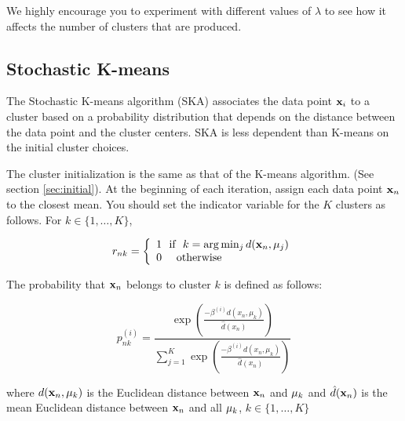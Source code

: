 \documentclass[11pt]{article}
\newcommand{\vxi}{{\bf x}_i}
\newcommand{\vxn}{{\bf x}_n}
\newcommand{\vmuk}{{\bf \mu}_k}
\newcommand{\vmuj}{{\bf \mu}_j}
\begin{document}
We highly encourage you to experiment with different values of $\lambda$ to see how it affects the number of clusters that are produced.

\subsection{Stochastic K-means}
The Stochastic K-means algorithm (SKA) associates the data point $\vxi$ to a cluster based on a probability distribution that depends on the distance between the data point and the cluster centers. SKA is less dependent than K-means on the initial cluster choices.

The cluster initialization is the same as that of the K-means algorithm. (See section \ref{sec:initial}). At the beginning of each iteration, assign each data point $\vxn$ to the closest mean. You should set the indicator variable for the $K$ clusters as follows. For $k \in \{1,\ldots,K\}$,


\begin{equation}
\label{eq:E4}
r_{nk} =  \left\{
     \begin{array}{lr}
        1~~  \textrm{if} ~~  k = \arg\min_j d(\vxn, \vmuj)  \\
        0 ~~   ~~ \textrm{otherwise}
     \end{array}
   \right.
\end{equation}

\noindent The probability that $\vxn$ belongs to cluster $k$ is defined as follows:

\begin{equation}
\label{eq:E5}
p_{nk}^{(i)} =  \frac{\exp\left(\frac{-\beta^{(i)}d(x_n,\mu_k)}{\hat{d}(x_n)}\right)}{\sum_{j=1}^{K} \exp\left(\frac{-\beta^{(i)}d(x_n,\mu_k)}{\hat{d}(x_n)}\right) }
\end{equation}

\noindent where $d(\vxn,\vmuk)$ is the Euclidean distance between $\vxn$ and $\vmuk$ and $\hat{d}(\vxn)$ is the mean Euclidean distance between $\vxn$ and all $\vmuk$, $k \in \{1,\ldots,K\}$
\end{document}
